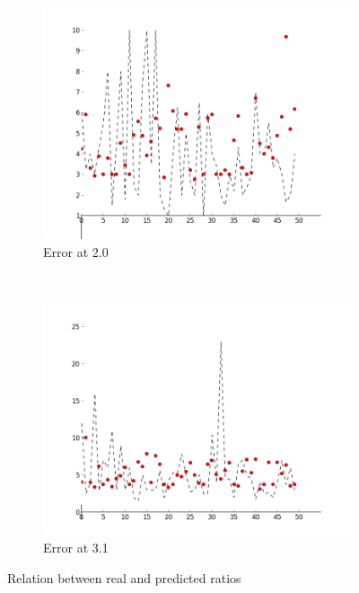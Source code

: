 \documentclass[a4paper,10pt]{article}
\begin{document}
\begin{figure}[h!]
\centering
\begin{subfigure}[b]{0.5\textwidth}
\includegraphics[width=\textwidth]{Images/ratio_graph_20.png}
\caption{Error at 2.0}
\label{fig:err20}
\end{subfigure}%
~ %
\begin{subfigure}[b]{0.5\textwidth}
\includegraphics[width=\textwidth]{Images/ratio_graph_31.png}
\caption{Error at 3.1}
\label{fig:err31}
\end{subfigure}
\caption{Relation between real and predicted ratios}
\label{fig:error}
\end{figure}
\end{document}
